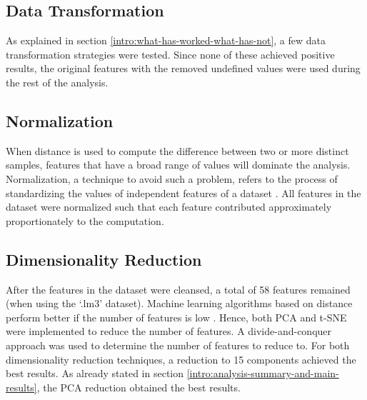 \subsection{Data Transformation}

As explained in section \ref{intro:what-has-worked-what-has-not}, a few data transformation strategies were tested. Since none of these achieved positive results, the original features with the removed undefined values were used during the rest of the analysis.

\subsection{Normalization}

When distance is used to compute the difference between two or more distinct samples, features that have a broad range of values will dominate the analysis. Normalization, a technique to avoid such a problem, refers to the process of standardizing the values of independent features of a dataset \cite{data-mining-intro}. All features in the dataset were normalized such that each feature contributed approximately proportionately to the computation.

\subsection{Dimensionality Reduction}

After the features in the dataset were cleansed, a total of 58 features remained (when using the `.lm3' dataset). Machine learning algorithms based on distance perform better if the number of features is low \cite{data-mining-intro}. Hence, both PCA and t-SNE were implemented to reduce the number of features.
A divide-and-conquer approach was used to determine the number of features to reduce to. For both dimensionality reduction techniques, a reduction to 15 components achieved the best results. As already stated in section \ref{intro:analysis-summary-and-main-results}, the PCA reduction obtained the best results.
